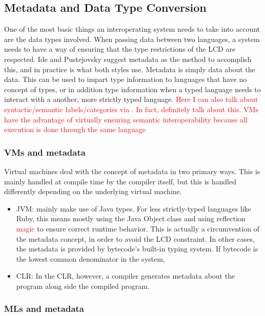 \documentclass{sig-alternate}
\newcommand{\mycomment}[1]{\textcolor{red}{#1}}
\begin{document}
\subsection*{Metadata and Data Type Conversion} \cite{Ide:2010, Bromberg:2011, Hamilton:2003}
One of the most basic things an interoperating system needs to take into account are the data types involved. 
When passing data between two languages, a system needs to have a way of ensuring that the type restrictions of the LCD are respected. Ide and Pustejovsky \cite{Ide:2010} suggest metadata as the method to accomplish this, and in practice is what both styles use. Metadata is simply data about the data. This can be used to impart type information to languages that have no concept of types, or in addition type information when a typed language needs to interact with a another, more strictly typed language.
\mycomment{Here I can also talk about syntactic/semantic labels/categories via \cite{Ide:2010}. In fact, definitely talk about this. VMs have the advantage of virtually ensuring semantic interoperability because all execution is done through the same language}
\subsubsection*{VMs and metadata}
Virtual machines deal with the concept of metadata in two primary ways. This is mainly handled at compile time by the compiler itself, but this is handled differently depending on the underlying virtual machine.
\begin{itemize}
\item JVM: mainly make use of Java types. For less strictly-typed languages like Ruby, this means mostly using the Java Object class and using reflection \mycomment{magic} to ensure correct runtime behavior. This is actually a circumvention of the metadata concept, in order to avoid the LCD constraint. In other cases, the metadata is provided by bytecode's built-in typing system. If bytecode is the lowest common denominator in the system, 
\item CLR: In the CLR, however, a compiler generates metadata about the program along side the compiled program\cite{Hamilton:2003}.
\end{itemize}

\subsubsection*{MLs and metadata}
\end{document}
